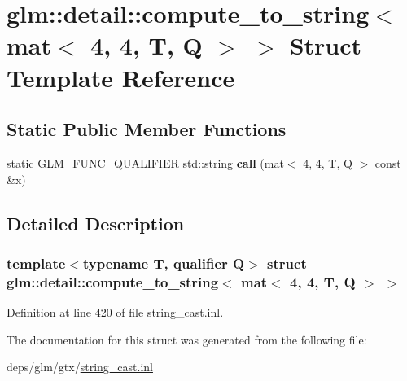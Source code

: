 \hypertarget{structglm_1_1detail_1_1compute__to__string_3_01mat_3_014_00_014_00_01T_00_01Q_01_4_01_4}{}\section{glm\+:\+:detail\+:\+:compute\+\_\+to\+\_\+string$<$ mat$<$ 4, 4, T, Q $>$ $>$ Struct Template Reference}
\label{structglm_1_1detail_1_1compute__to__string_3_01mat_3_014_00_014_00_01T_00_01Q_01_4_01_4}
\subsection*{Static Public Member Functions}
\begin{DoxyCompactItemize}
\item 
\mbox{\label{structglm_1_1detail_1_1compute__to__string_3_01mat_3_014_00_014_00_01T_00_01Q_01_4_01_4_a2bcb205f92a1451a9292f463bbb41288}} 
static G\+L\+M\+\_\+\+F\+U\+N\+C\+\_\+\+Q\+U\+A\+L\+I\+F\+I\+ER std\+::string {\bfseries call} (\hyperlink{structglm_1_1mat}{mat}$<$ 4, 4, T, Q $>$ const \&x)
\end{DoxyCompactItemize}


\subsection{Detailed Description}
\subsubsection*{template$<$typename T, qualifier Q$>$\newline
struct glm\+::detail\+::compute\+\_\+to\+\_\+string$<$ mat$<$ 4, 4, T, Q $>$ $>$}



Definition at line 420 of file string\+\_\+cast.\+inl.



The documentation for this struct was generated from the following file\+:\begin{DoxyCompactItemize}
\item 
deps/glm/gtx/\hyperlink{string__cast_8inl}{string\+\_\+cast.\+inl}\end{DoxyCompactItemize}
